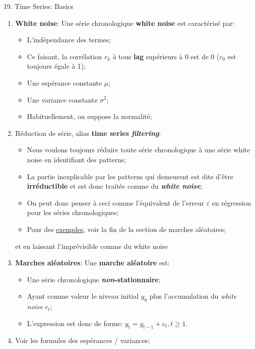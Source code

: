 \documentclass[12pt, titlepage, french]{report}
\begin{document}
\begin{CHPT_SUMM}{19. Time Series: Basics}
\begin{enumerate}
\begin{itemize}
\begin{itemize}
			\item	Si aucun des moments plus élevés varient avec le temps, alors la série est \textbf{\textit{strongly} stationary};
		\end{itemize}
	\end{itemize}
	\item	\textbf{White noise}: Une série chronologique \textbf{white noise} est caractérisé par:
	\begin{itemize}
		\item	L'indépendance des termes;
		\item[]	Ce faisant, la corrélation $r_{k}$ à tous \textbf{lag} supérieurs à 0 est de 0 ($r_{0}$ est toujours égale à 1);
		\item	Une espérance constante $\mu$;
		\item	Une variance constante $\sigma^{2}$;
		\item	Habituellement, on suppose la normalité;
	\end{itemize}
	\item[]	Réduction de série, alias \textbf{time series \textit{filtering}}:
	\begin{itemize}
		\item	Nous voulons toujours réduire toute série chronologique à une série white noise en identifiant des patterns;
		\item	La partie inexplicable par les patterns qui demeurent est dite d'être \textbf{irréductible} et est donc traitée comme du \textbf{\textit{white noise}};
		\item	On peut donc penser à ceci comme l'équivalent de l'erreur $\varepsilon$ en régression pour les séries chronologiques;
		\item	Pour des \hyperref[sec:ex_rand_walk]{exemples}, voir la fin de la section de marches aléatoires;
	\end{itemize}
	 et en laissant l'imprévisible comme du white noise
	\item	\textbf{Marches aléatoires}: Une \textbf{marche aléatoire} est:
	\begin{itemize}
		\item	Une série chronologique \textbf{\textit{non}-stationnaire};
		\item	Ayant comme valeur le niveau initial $y_{0}$ plus l'accumulation du \textit{white noise} $c_{t}$;
		\item	L'expression est donc de forme: $y_{t} = y_{t - 1} + c_{t}, t \ge 1$.
	\end{itemize}
	\item[]	Voir les formules des espérances / variances;

\end{enumerate}
\end{CHPT_SUMM}
\end{document}
